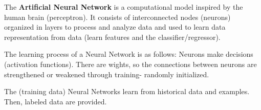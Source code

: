 \begin{deepeningbox}
    The \textbf{Artificial Neural Network} is a computational model inspired by the human brain (perceptron). It consists of interconnected nodes (neurons) organized in layers to process and analyze data and used to learn data representation from data (learn features and the classifier/regressor).

    \highspace
    The learning process of a Neural Network is as follows: Neurons make decisions (activation functions). There are wights, so the connections between neurons are strengthened or weakened through training- randomly initialized.

    The (training data) Neural Networks learn from historical data and examples. Then, labeled data are provided.
\end{deepeningbox}

